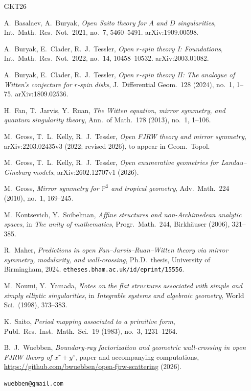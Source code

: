 \documentclass[11pt]{amsart}
\theoremstyle{definition}
\theoremstyle{remark}
\begin{document}
\begin{thebibliography}{GKT26}

 A.~Basalaev, A.~Buryak,
\emph{Open Saito theory for $A$ and $D$ singularities},
Int.\ Math.\ Res.\ Not.\ 2021, no.~7, 5460--5491. arXiv:1909.00598.

 A.~Buryak, E.~Clader, R.~J.~Tessler,
\emph{Open $r$-spin theory I: Foundations},
Int.\ Math.\ Res.\ Not.\ 2022, no.~14, 10458--10532. arXiv:2003.01082.

 A.~Buryak, E.~Clader, R.~J.~Tessler,
\emph{Open $r$-spin theory II: The analogue of Witten's conjecture for $r$-spin
disks}, J.\ Differential Geom.\ 128 (2024), no.~1, 1--75. arXiv:1809.02536.

 H.~Fan, T.~Jarvis, Y.~Ruan,
\emph{The Witten equation, mirror symmetry, and quantum singularity theory},
Ann.\ of Math.\ 178 (2013), no.~1, 1--106.

 M.~Gross, T.~L.~Kelly, R.~J.~Tessler,
\emph{Open FJRW theory and mirror symmetry},
arXiv:2203.02435v3 (2022; revised 2026), to appear in Geom.~Topol.

 M.~Gross, T.~L.~Kelly, R.~J.~Tessler,
\emph{Open enumerative geometries for Landau--Ginzburg models},
arXiv:2602.12707v1 (2026).

 M.~Gross,
\emph{Mirror symmetry for $\mathbb{P}^{2}$ and tropical geometry},
Adv.\ Math.\ 224 (2010), no.~1, 169--245.

 M.~Kontsevich, Y.~Soibelman,
\emph{Affine structures and non-Archimedean analytic spaces},
in \emph{The unity of mathematics}, Progr.\ Math.\ 244, Birkh\"auser (2006),
321--385.

 R.~Maher,
\emph{Predictions in open Fan--Jarvis--Ruan--Witten theory via mirror symmetry,
modularity, and wall-crossing}, Ph.D.\ thesis, University of Birmingham, 2024.
\texttt{etheses.bham.ac.uk/id/eprint/15556}.

 M.~Noumi, Y.~Yamada,
\emph{Notes on the flat structures associated with simple and simply elliptic
singularities}, in \emph{Integrable systems and algebraic geometry}, World Sci.\
(1998), 373--383.

 K.~Saito,
\emph{Period mapping associated to a primitive form},
Publ.\ Res.\ Inst.\ Math.\ Sci.\ 19 (1983), no.~3, 1231--1264.

 B.~J.~Wuebben,
\emph{Boundary-ray factorization and geometric wall-crossing in open FJRW theory
of $x^{r}+y^{s}$},
paper and accompanying computations,
\url{https://github.com/bwuebben/open-fjrw-scattering} (2026).

\end{thebibliography}

\bigskip
{} \texttt{wuebben@gmail.com}
\end{document}
